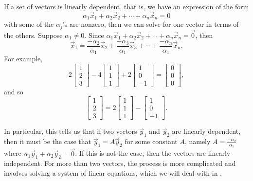 If a set of vectors is linearly dependent, that is, we have an expression of the form
\begin{equation*}
\alpha_1\vec{x}_1 + \alpha_2\vec{x}_2 + \cdots + \alpha_n\vec{x}_n = 0
\end{equation*}
with some of the $\alpha_j$'s
are nonzero, then we can solve for one vector in terms of the others.
Suppose $\alpha_1 \not= 0$.  Since
$\alpha_1 \vec{x}_1 + 
\alpha_2 \vec{x}_2 + 
\cdots +
\alpha_n \vec{x}_n 
=
\vec{0}$, then
\begin{equation*}
\vec{x}_1 
=
\frac{-\alpha_2}{\alpha_1}
\vec{x}_2 + 
\frac{-\alpha_3}{\alpha_1}
\vec{x}_3 + 
\cdots +
\frac{-\alpha_n}{\alpha_1}
\vec{x}_n .
\end{equation*}
For example,
\begin{equation*}
2
\begin{bmatrix} 1 \\ 2 \\ 3 \end{bmatrix}
-4
\begin{bmatrix} 1 \\ 1 \\ 1 \end{bmatrix}
+
2 \begin{bmatrix} 1 \\ 0 \\ -1 \end{bmatrix}
=
\begin{bmatrix} 0 \\ 0 \\ 0 \end{bmatrix} ,
\end{equation*}
and so
\begin{equation*}
\begin{bmatrix} 1 \\ 2 \\ 3 \end{bmatrix}
=
2
\begin{bmatrix} 1 \\ 1 \\ 1 \end{bmatrix}
-
\begin{bmatrix} 1 \\ 0 \\ -1 \end{bmatrix} .
\end{equation*}

In particular, this tells us that if two vectors $\vec{y}_1$ and $\vec{y}_2$ are linearly dependent, then it must be the case that $\vec{y}_1 = A\vec{y}_2$ for some constant $A$, namely $A = \frac{-\alpha_2}{\alpha_1}$ where $\alpha_1\vec{y}_1 + \alpha_2\vec{y}_2 = \vec{0}$. If this is not the case, then the vectors are linearly independent. For more than two vectors, the process is more complicated and involves solving a system of linear equations, which we will deal with in .


